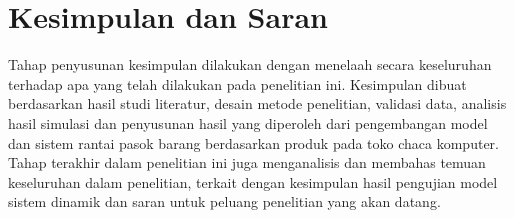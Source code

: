 \section{Kesimpulan dan Saran}

Tahap penyusunan kesimpulan dilakukan dengan menelaah secara keseluruhan terhadap apa yang telah dilakukan pada penelitian ini. Kesimpulan dibuat berdasarkan hasil studi literatur, desain metode penelitian, validasi data, analisis hasil simulasi dan penyusunan hasil yang diperoleh dari pengembangan model dan sistem rantai pasok barang berdasarkan produk pada toko chaca komputer. Tahap terakhir dalam penelitian ini juga menganalisis dan membahas temuan keseluruhan dalam penelitian, terkait dengan kesimpulan hasil pengujian model sistem dinamik dan saran untuk peluang penelitian yang akan datang. 